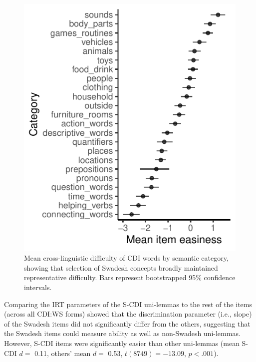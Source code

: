 \documentclass[10pt, letterpaper]{article}
\newenvironment{CodeChunk}{}{}
\begin{document}
\begin{CodeChunk}
\begin{figure}[h]

{\centering \includegraphics{figs/difficulty-by-category-1} 

}

\caption[Mean cross-linguistic difficulty of CDI words by semantic category, showing that selection of Swadesh concepts broadly maintained representative difficulty]{Mean cross-linguistic difficulty of CDI words by semantic category, showing that selection of Swadesh concepts broadly maintained representative difficulty. Bars represent bootstrapped 95\% confidence intervals.}\label{fig:difficulty-by-category}
\end{figure}
\end{CodeChunk}

Comparing the IRT parameters of the S-CDI uni-lemmas to the rest of the
items (across all CDI:WS forms) showed that the discrimination parameter
(i.e., slope) of the Swadesh items did not significantly differ from the
others, suggesting that the Swadesh items could measure ability as well
as non-Swadesh uni-lemmas. However, S-CDI items were significantly
easier than other uni-lemmas (mean S-CDI \(d=\) 0.11, others' mean
\(d=\) 0.53, \(t(8749)=-13.09\), \(p<.001\)).
\end{document}

